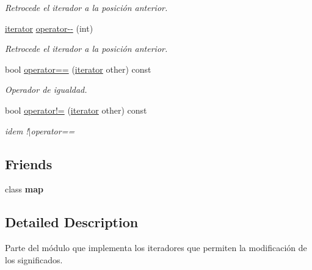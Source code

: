 \begin{DoxyCompactItemize}
\begin{DoxyCompactList}\small\item\em Retrocede el iterador a la posición anterior. \end{DoxyCompactList}\item 
\hyperlink{classaed2_1_1iterator_1_1iterator}{iterator} \hyperlink{classaed2_1_1iterator_1_1iterator_a6bd61026c75767d0d41e45229144e9d0}{operator-\/-\/} (int)
\begin{DoxyCompactList}\small\item\em Retrocede el iterador a la posición anterior. \end{DoxyCompactList}\item 
bool \hyperlink{classaed2_1_1iterator_1_1iterator_a565d56436e9490edab1ea31803af34ae}{operator==} (\hyperlink{classaed2_1_1iterator_1_1iterator}{iterator} other) const
\begin{DoxyCompactList}\small\item\em Operador de igualdad. \end{DoxyCompactList}\item 
\mbox{\label{classaed2_1_1iterator_1_1iterator_a1c42a3d770db85a6b25abf05e7fa1683}} 
bool \hyperlink{classaed2_1_1iterator_1_1iterator_a1c42a3d770db85a6b25abf05e7fa1683}{operator!=} (\hyperlink{classaed2_1_1iterator_1_1iterator}{iterator} other) const
\begin{DoxyCompactList}\small\item\em idem !$\vert$operator== \end{DoxyCompactList}\end{DoxyCompactItemize}
\subsection*{Friends}
\begin{DoxyCompactItemize}
\item 
\mbox{\label{classaed2_1_1iterator_1_1iterator_aeda338414e516b47761f994fb78056c6}} 
class {\bfseries map}
\end{DoxyCompactItemize}


\subsection{Detailed Description}
Parte del módulo que implementa los iteradores que permiten la modificación de los significados. 

